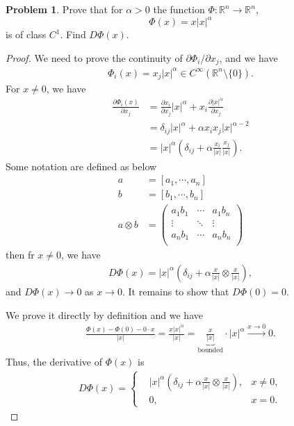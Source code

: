 \documentclass[11pt]{article}
\theoremstyle{definition}
\newtheorem{problem}{Problem}
\theoremstyle{definition}
\begin{document}
\medskip

\begin{problem}
Prove that for $\alpha>0$ the function $\Phi:\mathbb{R}^n\to\mathbb{R}^n$,
$$
\Phi(x)=x|x|^\alpha
$$
is of class $C^1$. Find $D\Phi(x)$.
\end{problem}
\begin{proof}
We need to prove the continuity of $\partial \Phi_i/\partial x_j$, and we have 
\begin{align*}
    \Phi_i (x) = x_j |x|^\alpha \in C^\infty \left( \mathbb{R}^n\setminus \{0\}\right).
\end{align*}
For $x\neq 0$, we have
\begin{align*}
    \frac{\partial \Phi_i(x)}{\partial x_j} & = \frac{\partial x_i}{\partial x_j} |x|^\alpha + x_i \frac{\partial |x|^\alpha}{\partial x_j} \\
    & = \delta_{ij} |x|^\alpha + \alpha x_i x_j |x|^{\alpha - 2} \\
    & = |x|^\alpha \left( \delta_{ij} + \alpha \frac{x_i}{|x|} \frac{x_j}{|x|} \right).
\end{align*}
Some notation are defined as below 
\begin{align*}
    a & = \left[a_1,\cdots,a_n\right]\\
    b & = \left[b_1,\cdots,b_n\right]\\
    a \otimes b & = \begin{pmatrix}
        a_1 b_1 & \cdots &  a_1 b_n\\
        \vdots  & \ddots &  \vdots \\
        a_n b_1 & \cdots & a_n b_n \\
    \end{pmatrix}
\end{align*}
then fr $x\neq 0$, we have 
\begin{align*}
    D\Phi(x) = |x|^\alpha \left( \delta_{ij} + \alpha \frac{x}{|x|} \otimes \frac{x}{|x|} \right),
\end{align*}
and $D\Phi(x) \to 0$ as $x \to 0$. It remains to show that $D\Phi(0) = 0$. 

We prove it directly by definition and we have 
\begin{align*}
    \frac{\Phi(x) - \Phi(0) - 0\cdot x}{|x|} = \frac{x|x|^\alpha}{|x|} = \underbrace{\frac{x}{|x|}}_{\text{bounded}} \cdot |x|^\alpha \xrightarrow{x \to 0} 0.
\end{align*}
Thus, the derivative of $\Phi(x)$ is
\begin{align*}
    D\Phi(x) = \left\{
    \begin{aligned}
        & |x|^\alpha \left( \delta_{ij} + \alpha \frac{x}{|x|} \otimes \frac{x}{|x|} \right), & x \neq 0,\\
        & 0, & x = 0.
    \end{aligned}
    \right.
\end{align*}
\end{proof}
\end{document}
